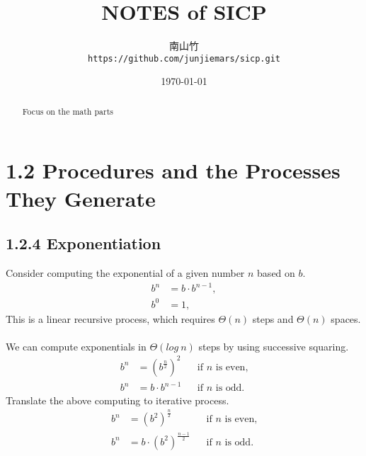 \documentclass{article}
\begin{document}
\title{NOTES of SICP}
\author{南山竹\\
  \texttt{https://github.com/junjiemars/sicp.git}}
\date{\today}
\maketitle

\begin{abstract}
Focus on the math parts
\end{abstract}


\section*{1.2 Procedures and the Processes They Generate}

\subsection*{1.2.4 Exponentiation}
Consider computing the exponential of a given number $n$ based on $b$.
\begin{align*}
b^n &= b \cdot b^{n-1},\\
b^0 &= 1,
\end{align*}
This is a linear recursive process, which requires $\Theta(n)$ steps and $\Theta(n)$ spaces.\\
\\
We can compute exponentials in $\Theta(log\: n)$ steps by using successive squaring.
\begin{align*}
b^n &= (b^{\frac{n}{2}})^2 && \text{if } n \text{ is even,}\\
b^n &= b \cdot b^{n-1} && \text{if } n \text{ is odd.}
\end{align*}
Translate the above computing to iterative process.
\begin{align*}
b^n &= (b^2)^{\frac{n}{2}} && \text{if } n \text{ is even,}\\
b^n &= b \cdot (b^2)^{\frac{n-1}{2}} && \text{if } n \text{ is odd.}
\end{align*}
\end{document}

